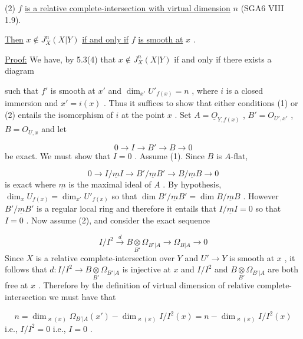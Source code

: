 (2)  $f$  \underline{is a relative complete-intersection with virtual dimension} $n$ (SGA6 VIII 1.9).

\underline{Then} $x \notin J^{n}_{X}(X|Y)$ \underline{if and only if} $f$ \underline{is smooth at} $x$ .

\underline{Proof:}  We have, by 5.3(4) that $x \notin J^{n}_{X}(X|Y)$ if and only if there exists a diagram
such that $f'$ is smooth at $x'$ and $\dim_{x'}U'_{f(x)} = n$ , where $i$ is a closed immersion and $x' = i(x)$ . Thus it suffices to show that either conditions (1) or (2) entails the isomorphism of $i$ at the point $x$ . Set $A = \underline{O}_{Y,f(x)}$ , $B' = O_{U',x'}$ , $B = O_{U,x}$ and let

\begin{equation*}
0 \to I \to B' \to B \to 0
\end{equation*}
be exact. We must show that $I = 0$ . Assume (1). Since $B$ is $A$-flat,

\begin{equation*}
0 \to I/\underline{m}I \to B'/\underline{m}B' \to B/\underline{m}B \to 0
\end{equation*}
is exact where $\underline{m}$ is the maximal ideal of $A$ . By hypothesis, $\dim_{x}U_{f(x)} = \dim_{x'}U'_{f(x)}$ so that $\dim B'/\underline{m}B' = \dim B/\underline{m}B$ . However $B'/\underline{m}B'$ is a regular local ring and therefore it entails that $I/\underline{m}I = 0$ so that $I = 0$ . Now assume (2), and consider the exact sequence

\begin{equation*}
I/I^{2} \overset{d}{\to} B \underset{B'}{\otimes} \Omega_{B'|A} \to \Omega_{B|A} \to 0
\end{equation*}
Since $X$ is a relative complete-intersection over $Y$ and $U' \to Y$ is smooth at $x$ , it follows that $d : I/I^{2} \to B \underset{B'}{\otimes} \Omega_{B'|A}$ is injective at $x$ and $I/I^{2}$ and $B \underset{B'}{\otimes} \Omega_{B'|A}$ are both free at $x$ . Therefore by the definition of virtual dimension of relative complete-intersection we must have that

\begin{equation*}
n = \dim_{\varkappa(x)}\Omega_{B'|A}(x') - \dim_{\varkappa(x)}I/I^{2}(x) = n - \dim_{\varkappa(x)}I/I^{2}(x)
\end{equation*}
i.e., $I/I^{2} = 0$ i.e., $I = 0$ .

